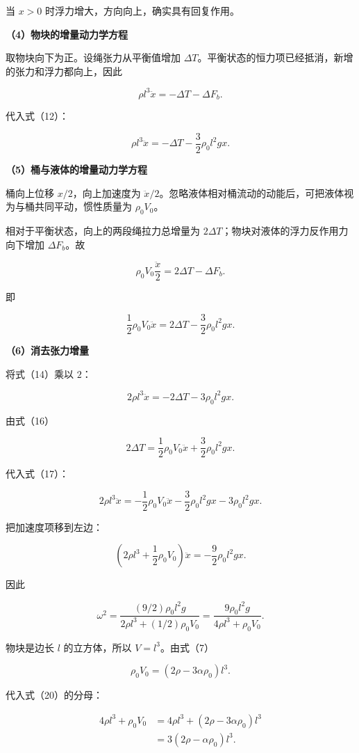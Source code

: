 \documentclass[12pt,a4paper,UTF8]{ctexart}
\begin{document}
当 \(x>0\) 时浮力增大，方向向上，确实具有回复作用。

\textbf{（4）物块的增量动力学方程}

取物块向下为正。设绳张力从平衡值增加
\(\Delta T\)。平衡状态的恒力项已经抵消，新增的张力和浮力都向上，因此

\[
\rho l^3\ddot x
=-\Delta T-\Delta F_b.
\tag{13}
\]

代入式（12）：

\[
\boxed{
\rho l^3\ddot x
=-\Delta T-\frac32\rho_0l^2gx
}.
\tag{14}
\]

\textbf{（5）桶与液体的增量动力学方程}

桶向上位移 \(x/2\)，向上加速度为
\(\ddot x/2\)。忽略液体相对桶流动的动能后，可把液体视为与桶共同平动，惯性质量为
\(\rho_0V_0\)。

相对于平衡状态，向上的两段绳拉力总增量为
\(2\Delta T\)；物块对液体的浮力反作用力向下增加 \(\Delta F_b\)。故

\[
\rho_0V_0\frac{\ddot x}{2}
=2\Delta T-\Delta F_b.
\tag{15}
\]

即

\[
\boxed{
\frac12\rho_0V_0\ddot x
=2\Delta T-\frac32\rho_0l^2gx
}.
\tag{16}
\]

\textbf{（6）消去张力增量}

将式（14）乘以 \(2\)：

\[
2\rho l^3\ddot x
=-2\Delta T-3\rho_0l^2gx.
\tag{17}
\]

由式（16）

\[
2\Delta T
=\frac12\rho_0V_0\ddot x
+\frac32\rho_0l^2gx.
\tag{18}
\]

代入式（17）：

\[
2\rho l^3\ddot x
=-\frac12\rho_0V_0\ddot x
-\frac32\rho_0l^2gx
-3\rho_0l^2gx.
\]

把加速度项移到左边：

\[
\left(
2\rho l^3+\frac12\rho_0V_0
\right)\ddot x
=-\frac92\rho_0l^2gx.
\tag{19}
\]

因此

\[
\omega^2
=\frac{(9/2)\rho_0l^2g}
{2\rho l^3+(1/2)\rho_0V_0}
=\frac{9\rho_0l^2g}
{4\rho l^3+\rho_0V_0}.
\tag{20}
\]

物块是边长 \(l\) 的立方体，所以 \(V=l^3\)。由式（7）

\[
\rho_0V_0
=(2\rho-3\alpha\rho_0)l^3.
\tag{21}
\]

代入式（20）的分母：

\[
\begin{aligned}
4\rho l^3+\rho_0V_0
&=4\rho l^3+(2\rho-3\alpha\rho_0)l^3\\
&=3(2\rho-\alpha\rho_0)l^3.
\end{aligned}
\]
\end{document}
